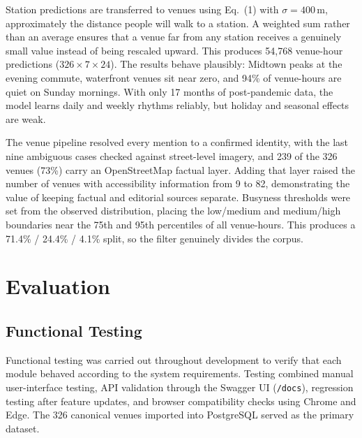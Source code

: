 \documentclass[conference]{IEEEtran}
\begin{document}
Station predictions are transferred to venues using Eq.~(1) with $\sigma=400$\,m, approximately the distance people will walk to a station. A weighted sum rather than an average ensures that a venue far from any station receives a genuinely small value instead of being rescaled upward. This produces 54,768 venue-hour predictions ($326\times7\times24$). The results behave plausibly: Midtown peaks at the evening commute, waterfront venues sit near zero, and 94\% of venue-hours are quiet on Sunday mornings. With only 17 months of post-pandemic data, the model learns daily and weekly rhythms reliably, but holiday and seasonal effects are weak.

The venue pipeline resolved every mention to a confirmed identity, with the last nine ambiguous cases checked against street-level imagery, and 239 of the 326 venues (73\%) carry an OpenStreetMap factual layer. Adding that layer raised the number of venues with accessibility information from 9 to 82, demonstrating the value of keeping factual and editorial sources separate. Busyness thresholds were set from the observed distribution, placing the low/medium and medium/high boundaries near the 75th and 95th percentiles of all venue-hours. This produces a 71.4\% / 24.4\% / 4.1\% split, so the filter genuinely divides the corpus.



\section{Evaluation}
\label{sec:evaluation}


\subsection{Functional Testing}

Functional testing was carried out throughout development to verify that each module behaved according to the system requirements. Testing combined manual user-interface testing, API validation through the Swagger UI (\texttt{/docs}), regression testing after feature updates, and browser compatibility checks using Chrome and Edge. The 326 canonical venues imported into PostgreSQL served as the primary dataset.
\end{document}
